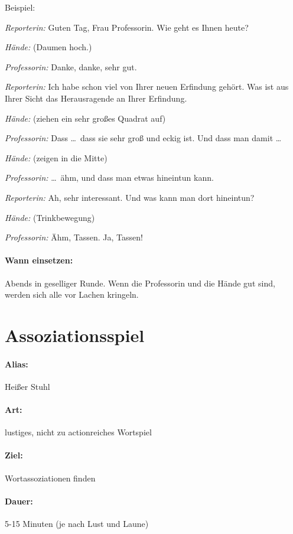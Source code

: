 Beispiel:

\emph{Reporterin:} Guten Tag, Frau Professorin. Wie geht es Ihnen heute?

\emph{Hände:} (Daumen hoch.)

\emph{Professorin:} Danke, danke, sehr gut.

\emph{Reporterin:} Ich habe schon viel von Ihrer neuen Erfindung gehört. Was ist aus Ihrer Sicht das Herausragende an Ihrer Erfindung.

\emph{Hände:} (ziehen ein sehr großes Quadrat auf)

\emph{Professorin:} Dass \ldots\ dass sie sehr groß und eckig ist. Und dass man damit \ldots

\emph{Hände:} (zeigen in die Mitte)

\emph{Professorin:} \ldots\ ähm, und dass man etwas hineintun kann.

\emph{Reporterin:} Ah, sehr interessant. Und was kann man dort hineintun?

\emph{Hände:} (Trinkbewegung)

\emph{Professorin:} Ähm, Tassen. Ja, Tassen!

\paragraph{Wann einsetzen:} Abends in geselliger Runde. Wenn die Professorin und die Hände gut sind, werden sich alle vor Lachen kringeln.


\section{Assoziationsspiel}
\paragraph{Alias:} Heißer Stuhl
\paragraph{Art:} lustiges, nicht zu actionreiches Wortspiel
\paragraph{Ziel:} Wortassoziationen finden
\paragraph{Dauer:} 5-15 Minuten (je nach Lust und Laune)
